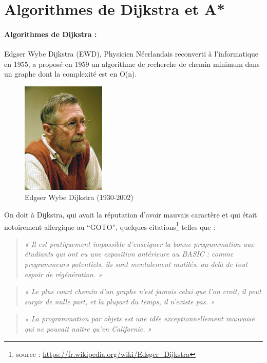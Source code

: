 \section{Algorithmes de Dijkstra et A*}


\paragraph{Algorithmes de Dijkstra : }Edgser Wybe Dijkstra (EWD), Physicien Néerlandais reconverti à l'informatique en 1955, a proposé en 1959 un algorithme de recherche de chemin minimum 
dans un graphe  dont  la complexité est en O(n). 

\begin{figure}[htp]
  \centering
  \includegraphics[width=4cm]{images/Edsger_Wybe_Dijkstra}
  \caption{Edgser Wybe Dijkstra (1930-2002)}
  \label{fig:une-autre-image}
\end{figure}

On doit à Dijkstra, qui avait la réputation d'avoir mauvais caractère et qui était notoirement  allergique au ``GOTO'',
quelques citations\footnote{source : \url{https://fr.wikipedia.org/wiki/Edsger_Dijkstra}} telles que :


\begin{quote}
\textit{« Il est pratiquement impossible d'enseigner la bonne programmation aux étudiants 
qui ont eu une exposition antérieure au BASIC : comme programmeurs potentiels, 
ils sont mentalement mutilés, au-delà de tout espoir de régénération. »}
\end{quote}

\begin{quote}
\textit{« Le plus court chemin d'un graphe n'est jamais celui que l'on croit, 
il peut surgir de nulle part, et la plupart du temps, il n'existe pas. »}
\end{quote}

\begin{quote}
\textit{« La programmation par objets est une idée exceptionnellement mauvaise qui ne pouvait naître qu'en Californie. »}
\end{quote}


